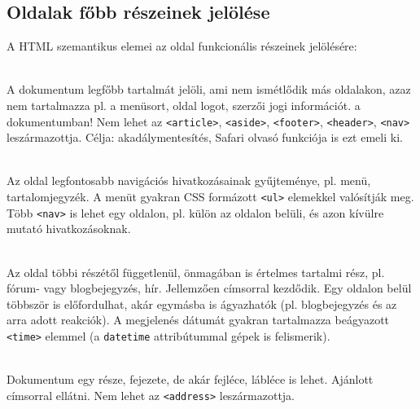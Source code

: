 \subsection{Oldalak főbb részeinek jelölése}

\begin{frame}
  A HTML szemantikus elemei az oldal funkcionális részeinek jelölésére:
  \begin{description}[m]
    \item[\texttt{<main>}] \hfill \\ A dokumentum legfőbb tartalmát jelöli, ami nem ismétlődik más oldalakon, azaz nem tartalmazza pl. a menüsort, oldal logot, szerzői jogi információt.  a dokumentumban! Nem lehet az \texttt{<article>}, \texttt{<aside>}, \texttt{<footer>}, \texttt{<header>}, \texttt{<nav>} leszármazottja. Célja: akadálymentesítés, Safari olvasó funkciója is ezt emeli ki.
    \item[\texttt{<nav>}] \hfill \\ Az oldal legfontosabb navigációs hivatkozásainak gyűjteménye, pl. menü, tartalomjegyzék. A menüt gyakran CSS formázott \texttt{<ul>} elemekkel valósítják meg. Több \texttt{<nav>} is lehet egy oldalon, pl. külön az oldalon belüli, és azon kívülre mutató hivatkozásoknak.
  \end{description} 
\end{frame}

\begin{frame}
  \begin{description}[m]
    \item[\texttt{<article>}] \hfill \\ Az oldal többi részétől függetlenül, önmagában is értelmes tartalmi rész, pl. fórum- vagy blogbejegyzés, hír. Jellemzően címsorral kezdődik. Egy oldalon belül többször is előfordulhat, akár egymásba is ágyazhatók (pl. blogbejegyzés és az arra adott reakciók). A megjelenés dátumát gyakran tartalmazza beágyazott \texttt{<time>} elemmel (a \texttt{datetime} attribútummal gépek is felismerik).
    \item[\texttt{<section>}] \hfill \\ Dokumentum egy része, fejezete, de akár fejléce, lábléce is lehet. Ajánlott címsorral ellátni. Nem lehet az \texttt{<address>} leszármazottja.
  \end{description} 
\end{frame}

